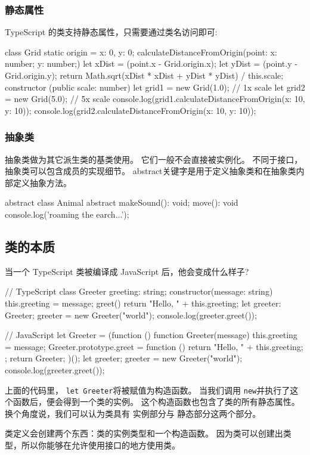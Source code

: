 \subsubsection*{静态属性}

TypeScript 的类支持静态属性，只需要通过类名访问即可:

\begin{TypeScript}
class Grid {
    static origin = {x: 0, y: 0};
    calculateDistanceFromOrigin(point: {x: number; y: number;}) {
        let xDist = (point.x - Grid.origin.x);
        let yDist = (point.y - Grid.origin.y);
        return Math.sqrt(xDist * xDist + yDist * yDist) / this.scale;
    }
    constructor (public scale: number) { }
}
let grid1 = new Grid(1.0);  // 1x scale
let grid2 = new Grid(5.0);  // 5x scale
console.log(grid1.calculateDistanceFromOrigin({x: 10, y: 10}));
console.log(grid2.calculateDistanceFromOrigin({x: 10, y: 10}));
\end{TypeScript}

\subsubsection*{抽象类}

抽象类做为其它派生类的基类使用。 它们一般不会直接被实例化。 不同于接口，抽象类可以包含成员的实现细节。 abstract关键字是用于定义抽象类和在抽象类内部定义抽象方法。

\begin{TypeScript}
abstract class Animal {
    abstract makeSound(): void;
    move(): void {
        console.log('roaming the earch...');
    }
}
\end{TypeScript}

\subsection{类的本质}

当一个 TypeScript 类被编译成 JavaScript 后，他会变成什么样子?

\begin{TypeScript}
// TypeScript
class Greeter {
    greeting: string;
    constructor(message: string) {
        this.greeting = message;
    }
    greet() {
        return "Hello, " + this.greeting;
    }
}
let greeter: Greeter;
greeter = new Greeter("world");
console.log(greeter.greet());

// JavaScript
let Greeter = (function () {
    function Greeter(message) {
        this.greeting = message;
    }
    Greeter.prototype.greet = function () {
        return "Hello, " + this.greeting;
    };
    return Greeter;
})();
let greeter;
greeter = new Greeter("world");
console.log(greeter.greet());
\end{TypeScript}

上面的代码里， \texttt{let Greeter}将被赋值为构造函数。 当我们调用 \texttt{new}并执行了这个函数后，便会得到一个类的实例。 这个构造函数也包含了类的所有静态属性。 换个角度说，我们可以认为类具有 实例部分与 静态部分这两个部分。

类定义会创建两个东西：类的实例类型和一个构造函数。 因为类可以创建出类型，所以你能够在允许使用接口的地方使用类。

\newpage